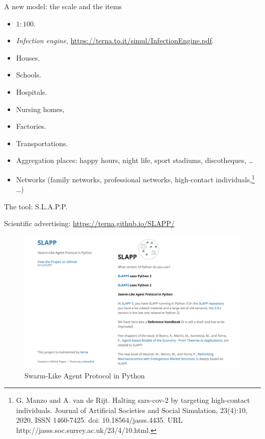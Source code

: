 \documentclass[9pt]{beamer}
\begin{document}
\begin{frame}{A new model: the scale and the items}

\begin{itemize}

\item $1:100$.

\item \textit{Infection engine}, \url{https://terna.to.it/simul/InfectionEngine.pdf}.

\item Houses.
\item Schools.
\item Hospitals.
\item Nursing homes,
\item Factories.
\color{red}
\item Transportations.
\item Aggregation places: happy hours, night life, sport stadiums, discotheques, \ldots
\color{blue}
\item Networks (family networks, professional networks, high-contact individuals,\footnote{G. Manzo and A. van de Rijt. Halting sars-cov-2 by targeting high-contact individuals. Journal of Artificial Societies and Social Simulation, 23(4):10, 2020. ISSN 1460-7425. doi: 10.18564/jasss.4435. URL http://jasss.soc.surrey.ac.uk/23/4/10.html.} \ldots) 

\end{itemize}

\end{frame}

\begin{frame}{The tool: S.L.A.P.P.}

Scientific advertising: \url{https://terna.github.io/SLAPP/}

\begin{figure}[H]
\center
\includegraphics[scale=0.26]{SLAPP.png}

\caption{Swarm-Like Agent Protocol in Python} 
\label{SLAPP}
\end{figure}

\end{frame}
\end{document}
